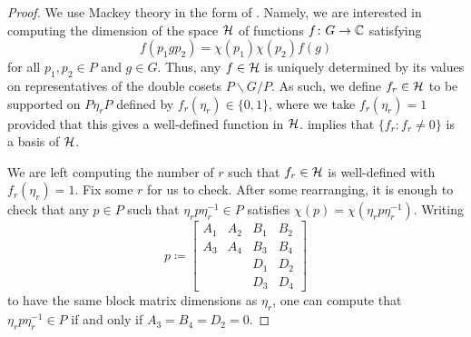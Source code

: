 \begin{proof}
    We use Mackey theory in the form of \cite[Theorem~32.1]{bump-lie-group}. Namely, we are interested in computing the dimension of the space $\mathcal{H}$ of functions $f\colon G\to\mathbb C$ satisfying
    \[f(p_1gp_2)=\chi(p_1)\chi(p_2)f(g)\]
    for all $p_1,p_2\in P$ and $g\in G$. Thus, any $f\in \mathcal{H}$ is uniquely determined by its values on representatives of the double cosets $P\backslash G/P$. As such, we define $f_r\in \mathcal{H}$ to be supported on $P\eta_rP$ defined by $f_r(\eta_r)\in\{0,1\}$, where we take $f_r(\eta_r)=1$ provided that this gives a well-defined function in $\mathcal{H}$.  implies that $\{f_r:f_r\ne0\}$ is a basis of $\mathcal{H}$.

    We are left computing the number of $r$ such that $f_r\in \mathcal{H}$ is well-defined with $f_r(\eta_r)=1$. Fix some $r$ for us to check. After some rearranging, it is enough to check that any
    $p\in P$ such that $\eta_rp\eta_r^{-1}\in P$ satisfies $\chi(p)=\chi\left(\eta_rp\eta_r^{-1}\right)$. Writing
    \[p\coloneqq\begin{bmatrix}
        A_1 & A_2 & B_1 & B_2 \\
        A_3 & A_4 & B_3 & B_4 \\
            &     & D_1 & D_2 \\
            &     & D_3 & D_4
    \end{bmatrix}\]
    to have the same block matrix dimensions as $\eta_r$, one can compute that $\eta_rp\eta_r^{-1}\in P$ if and only if $A_3=B_4=D_2=0$.

\end{proof}
